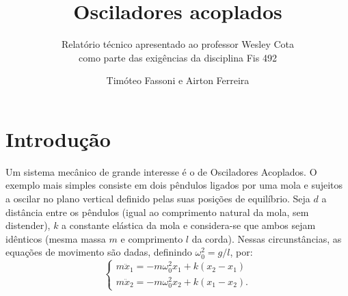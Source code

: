 \documentclass[a4paper, 11pt]{article}
\title{\textbf{Osciladores acoplados}}
\subtitle{Relatório técnico apresentado ao professor Wesley Cota\\ como parte das exigências da disciplina Fis 492}
\author{Timóteo Fassoni e Airton Ferreira}
\begin{document}
\maketitle

\section{Introdução}


	Um sistema mecânico de grande interesse é o de Osciladores Acoplados. O exemplo mais simples consiste em dois pêndulos ligados por uma mola e sujeitos a oscilar no plano vertical definido pelas suas posições de equilíbrio. Seja $d$ a distância entre os pêndulos (igual ao comprimento natural da mola, sem distender), $k$ a constante elástica da mola e considera-se que ambos sejam idênticos (mesma massa $m$ e comprimento $l$ da corda). Nessas circunstâncias, as equações de movimento são dadas, definindo $\omega_0^2=g/l$, por:
	\begin{equation}
	\begin{cases}
	m\ddot{x}_1 = - m\omega_0^2x_1 + k(x_2-x_1)\\
	m\ddot{x}_2 = - m\omega_0^2x_2 + k(x_1-x_2).
	\end{cases}
	\end{equation}
\end{document}

